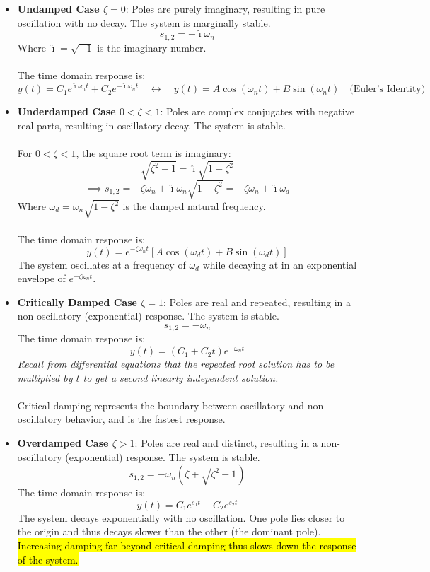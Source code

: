 ﻿\documentclass[12pt]{article}
\begin{document}
\begin{itemize}
    \item \textbf{Undamped Case \(\zeta = 0\)}: Poles are purely imaginary, resulting in pure oscillation with no decay. The system is marginally stable.
    \[s_{1,2} = \pm \hat{\imath}\omega_n\]
    Where $\hat{\imath} = \sqrt{-1}$ is the imaginary number.\\\\
    The time domain response is:
    \[y(t) = C_1 e^{\hat{\imath}\omega_n t} + C_2 e^{-\hat{\imath}\omega_n t} \quad \leftrightarrow\quad \boxed{y(t) = A \cos(\omega_n t) + B \sin(\omega_n t) \quad \text{(Euler's Identity)}}\]
    \item \textbf{Underdamped Case $0<\zeta<1$}: Poles are complex conjugates with negative real parts, resulting in oscillatory decay. The system is stable.\\\\
    For $0<\zeta<1$, the square root term is imaginary:
    \[\sqrt{\zeta^2 -1} = \hat{\imath}\sqrt{1-\zeta^2}\]
    \[\implies s_{1,2} = -\zeta \omega_n \pm \hat{\imath}\omega_n\sqrt{1-\zeta^2} = -\zeta \omega_n \pm \hat{\imath}\omega_d\]
    Where $\omega_d = \omega_n\sqrt{1-\zeta^2}$ is the damped natural frequency.\\\\
    The time domain response is:
    \[\boxed{y(t) = e^{-\zeta\omega_n t} \left[A \cos(\omega_d t) + B \sin(\omega_d t)\right]}\]
    The system oscillates at a frequency of $\omega_d$ while decaying at in an exponential envelope of $e^{-\zeta\omega_n t}$.
    \item \textbf{Critically Damped Case \(\zeta = 1\)}: Poles are real and repeated, resulting in a non-oscillatory (exponential) response. The system is stable.
    \[s_{1,2} = -\omega_n\]
    The time domain response is:
    \[\boxed{y(t) = (C_1 + C_2t)e^{-\omega_n t}}\]
    \textit{Recall from differential equations that the repeated root solution has to be multiplied by $t$ to get a second linearly independent solution.}\\\\
    Critical damping represents the boundary between oscillatory and non-oscillatory behavior, and is the fastest response.
    \item \textbf{Overdamped Case \(\zeta > 1\)}: Poles are real and distinct, resulting in a non-oscillatory (exponential) response. The system is stable.
    \[s_{1,2} = -\omega_n \left(\zeta \mp \sqrt{\zeta^2 -1}\right)\]
    The time domain response is:
    \[\boxed{y(t) = C_1 e^{s_1 t} + C_2 e^{s_2 t}}\]
    The system decays exponentially with no oscillation. One pole lies closer to the origin and thus decays slower than the other (the dominant pole). \hl{Increasing damping far beyond critical damping thus slows down the response of the system.}
\end{itemize}
\end{document}
